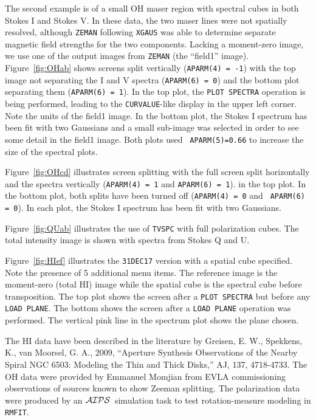 \documentclass[twoside]{article}
\newcommand{\AIPS}{{$\cal AIPS\/$}}
\begin{document}
The second example is of a small OH maser region with spectral cubes in
both Stokes I and Stokes V\@.  In these data, the two maser lines were
not spatially resolved, although {\tt ZEMAN} following {\tt XGAUS} was
able to determine separate magnetic field strengths for the two
components.  Lacking a moment-zero image, we use one of the output
images from {\tt ZEMAN} (the ``field1'' image).  Figure~\ref{fig:OHab}
shows screens split vertically ({\tt APARM(4) = -1}) with the top
image not separating the I and V spectra ({\tt APARM(6) = 0}) and the
bottom plot separating them ({\tt APARM(6) = 1})\@.  In the top plot,
the {\tt PLOT SPECTRA} operation is being performed, leading to the
{\tt CURVALUE}-like display in the upper left corner.  Note the units
of the field1 image.  In the bottom plot, the Stokes I spectrum has
been fit with two Gaussians and a small sub-image was selected in
order to see some detail in the field1 image.  Both plots used {\tt
  APARM(5)=0.66} to increase the size of the spectral plots.

Figure~\ref{fig:OHcd} illustrates screen splitting with the full
screen split horizontally and the spectra vertically ({\tt APARM(4) =
1} and {\tt APARM(6) = 1})\@. in the top plot.  In the bottom plot,
both splits have been turned off ({\tt APARM(4) = 0} and {\tt
APARM(6) = 0}).  In each plot, the Stokes I spectrum has been fit
with two Gaussians.

Figure~\ref{fig:QUab} illustrates the use of {\tt TVSPC} with full
polarization cubes.  The total intensity image is shown with spectra
from Stokes Q and U.

Figure~\ref{fig:HIef} illustrates the {\tt 31DEC17} version with a
spatial cube specified.  Note the presence of 5 additional menu items.
The reference image is the moment-zero (total HI) image while the
spatial cube is the spectral cube before transposition.  The top plot
shows the screen after a {\tt PLOT SPECTRA} but before any {\tt LOAD
  PLANE}\@.  The bottom shows the screen after a {\tt LOAD PLANE}
operation was performed.  The vertical pink line in the spectrum plot
shows the plane chosen.

The HI data have been described in the literature by Greisen, E. W.,
Spekkens, K., van Moorsel, G. A., 2009, ``Aperture Synthesis
Observations of the Nearby Spiral NGC 6503: Modeling the Thin and
Thick Disks,'' AJ, 137, 4718-4733.  The OH data were provided by
Emmanuel Momjian from EVLA commissioning observations of sources known
to show Zeeman splitting.  The polarization data were produced by
an \AIPS\ simulation task to test rotation-measure modeling in {\tt
  RMFIT}\@.
\end{document}
